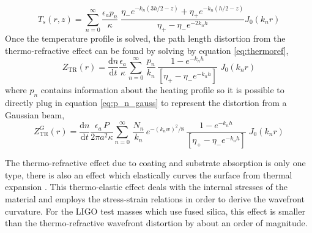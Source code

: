 	\begin{equation}
	T_s(r,z) = \sum_{n=0}^{\infty} \frac{\epsilon_a p_n}{\kappa}  \; \frac{ \eta_{-}e^{-k_n(3h/2-z)} + \eta_{+}e^{-k_n(h/2-z)}  }{\eta_{+} - \eta_{-} e^{-2k_n h} } J_0(k_n r)
	\end{equation} 
	Once the temperature profile is solved, the path length distortion from the thermo-refractive effect can be found by solving by equation \ref{eq:thermoref},
	\begin{equation}
	Z_{\text{TR}}(r) = \frac{\text{d}n}{\text{d}t} \frac{\epsilon_a}{\kappa} \sum_{n=0}^{\infty} \, \frac{p_n}{k_n} \, \frac{1- e^{-k_n h}}{[\eta_{+} - \eta_{-} e^{-k_nh}]} \; J_0(k_n r) 
	\end{equation}
	where $p_n$ contains information about the heating profile so it is possible to directly plug in equation \ref{eq:p_n_gauss} to represent the distortion from a Gaussian beam,
	\begin{equation}
	Z_{\text{TR}}^{G}(r) =  \frac{\text{d}n}{\text{d}t} \frac{\epsilon_a \, P}{2\pi a^2 \kappa} \sum_{n=0}^{\infty} \, \frac{N_n}{k_n}\, e^{-(k_n w)^2/8} \, \frac{1- e^{-k_n h}}{[\eta_{+} - \eta_{-} e^{-k_nh}]} \; J_0(k_n r) 
	\end{equation}

	The thermo-refractive effect due to coating and substrate absorption is only one type, there is also an effect which elastically curves the surface from thermal expansion \cite{Vinet_Thermal_Issues}.  This thermo-elastic effect deals with the internal stresses of the material and employs the stress-strain relations in order to derive the wavefront curvature.  For the LIGO test masses which use fused silica, this effect is smaller than the thermo-refractive wavefront distortion by about an order of magnitude.
	
